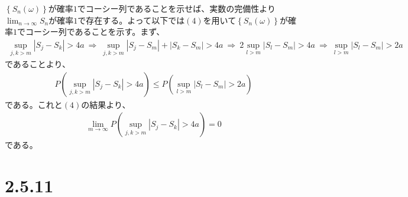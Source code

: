 \documentclass{article}
\begin{document}
$\left\{S_n(\omega)\right\}$が確率$1$でコーシー列であることを示せば、実数の完備性より$\lim_{n\to \infty} S_n$が確率$1$で存在する。よって以下では$(4)$を用いて$\left\{S_n(\omega)\right\}$が確率$1$でコーシー列であることを示す。まず、
\begin{align*}
	\sup_{j,k > m} \left| S_j - S_k \right| > 4a\ \Rightarrow\ \sup_{j,k > m} \left| S_j - S_m \right| + \left| S_k - S_m \right| > 4a\ \Rightarrow\ 2 \sup_{l > m} \left| S_l - S_m \right| > 4a\ \Rightarrow\ \sup_{l > m} \left| S_l - S_m \right| > 2a
\end{align*}
であることより、
\begin{align*}
	P\left( \sup_{j,k > m} \left| S_j - S_k \right| > 4a \right) \leq P\left( \sup_{l > m} \left| S_l - S_m \right| > 2a \right)
\end{align*}
である。これと$(4)$の結果より、
\begin{align*}
	\lim_{m \to \infty} P\left( \sup_{j,k > m} \left| S_j - S_k \right| > 4a \right) = 0
\end{align*}
である。


\section{2.5.11}
\end{document}
